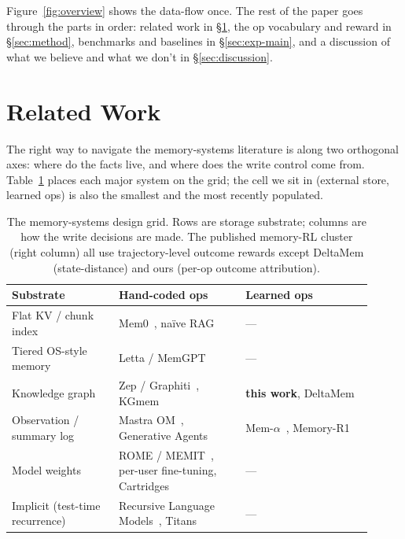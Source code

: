 \documentclass[11pt]{article}
\begin{document}
Figure~\ref{fig:overview} shows the data-flow once. The rest of the
paper goes through the parts in order: related work in
\S\ref{sec:related}, the op vocabulary and reward in \S\ref{sec:method},
benchmarks and baselines in \S\ref{sec:exp-main}, and a discussion of
what we believe and what we don't in \S\ref{sec:discussion}.

\section{Related Work}
\label{sec:related}

The right way to navigate the memory-systems literature is along two
orthogonal axes: where do the facts live, and where does the write
control come from. Table~\ref{tab:landscape} places each major system on
the grid; the cell we sit in (external store, learned ops) is also the
smallest and the most recently populated.

\begin{table}[h]
\centering
\small
\caption{The memory-systems design grid. Rows are storage substrate;
  columns are how the write decisions are made. The published memory-RL
  cluster (right column) all use trajectory-level outcome rewards
  except DeltaMem (state-distance) and ours (per-op outcome
  attribution).}
\label{tab:landscape}
\begin{tabular}{p{0.27\linewidth} p{0.32\linewidth} p{0.32\linewidth}}
\toprule
\textbf{Substrate} & \textbf{Hand-coded ops} & \textbf{Learned ops} \\
\midrule
Flat KV / chunk index   &
  Mem0~\cite{chhikara2024mem0}, naïve RAG & --- \\
Tiered OS-style memory  &
  Letta / MemGPT~\cite{zhang2024memgpt} & --- \\
Knowledge graph         &
  Zep / Graphiti~\cite{rasmussen2024zep}, KGmem &
  \textbf{this work}, DeltaMem~\cite{deltamem2026} \\
Observation / summary log &
  Mastra OM~\cite{mastra2025om}, Generative Agents~\cite{park2023generative} &
  Mem-$\alpha$~\cite{memalpha2025}, Memory-R1~\cite{memoryR1} \\
Model weights           &
  ROME / MEMIT~\cite{meng2022rome}, per-user fine-tuning,
  Cartridges~\cite{cartridges2025} & --- \\
Implicit (test-time recurrence) &
  Recursive Language Models~\cite{rlm2025},
  Titans~\cite{titans2025} & --- \\
\bottomrule
\end{tabular}
\end{table}
\end{document}
